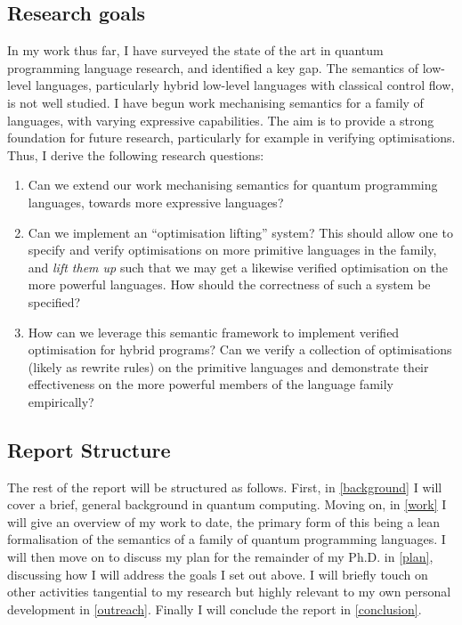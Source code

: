 \vspace{5mm}

\noindent{}

\subsection{Research goals}

In my work thus far, I have surveyed the state of the art in quantum programming language research, and identified a key gap.
% 
The semantics of low-level languages, particularly hybrid low-level languages with classical control flow, is not well studied. 
% 
I have begun work mechanising semantics for a family of languages, with varying expressive capabilities. 
% 
The aim is to provide a strong foundation for future research, particularly for 
example in verifying optimisations. 
% 
Thus, I derive the following research questions:

\begin{enumerate}[label={\textbf {RQ\arabic*}}]
    \item \label{goal-semantics-simple} Can we extend our work mechanising semantics for quantum programming languages, 
    towards more expressive languages?
    \item \label{goal-optimisation} Can we implement an ``optimisation lifting'' system?
    This should allow one to specify and verify optimisations on more primitive languages in the family, 
    and \emph{lift them up} such that we may get a likewise verified optimisation on the more powerful languages.
    How should the correctness of such a system be specified?
    \item \label{goal-optimisation-specific} How can we leverage this semantic framework to implement verified optimisation for hybrid programs?
    Can we verify a collection of optimisations (likely as rewrite rules) on the primitive languages 
    and demonstrate their effectiveness on the more powerful members of the language family empirically?
\end{enumerate}

\subsection{Report Structure}
The rest of the report will be structured as follows. 
% 
First, in \cref{background} I will cover a brief, general background in quantum computing.
% 
Moving on, in \cref{work} I will give an overview of my work to date, 
the primary form of this being a lean formalisation of the semantics of a family of quantum programming languages.
% 
I will then move on to discuss my plan for the remainder of my Ph.D. in \cref{plan}, discussing how I will
address the goals I set out above. 
% 
I will briefly touch on other activities tangential 
to my research but highly relevant to my own personal development in \cref{outreach}. 
% 
Finally I will conclude the report in \cref{conclusion}.

